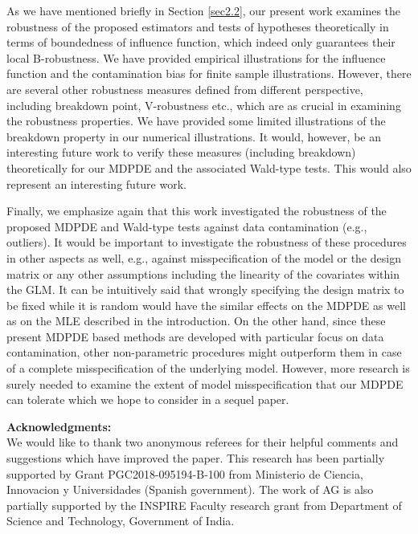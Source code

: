\documentclass[a4paper]{article}%
\begin{document}
As we have mentioned briefly in Section \ref{sec2.2}, 
our present work examines the robustness of the proposed estimators and tests of hypotheses theoretically 
in terms of boundedness of influence function, which indeed only guarantees their local B-robustness.
We have provided empirical illustrations for the influence function
and the contamination bias for finite sample illustrations. 
However, there are several other robustness measures defined from different perspective,
including breakdown point, V-robustness etc., which are as crucial in examining the robustness properties.
We have provided some limited illustrations of the breakdown property in our numerical illustrations. 
It would, however, be an interesting future work to verify these measures (including breakdown) theoretically for our MDPDE
and the associated Wald-type tests. 
This would also represent an interesting future work. 


Finally, we emphasize again that this work investigated the robustness of the proposed MDPDE and Wald-type tests
against data contamination (e.g., outliers). It would be important to investigate the robustness of these procedures
in other aspects as well, e.g., against misspecification of the model or the design matrix or 
any other assumptions including the linearity of the covariates within the GLM. 
It can be intuitively said that  wrongly specifying the design matrix to be fixed 
while it is random would have the similar effects on the MDPDE as well as on the MLE described in the introduction. 
On the other hand, since these present MDPDE based methods are developed with particular focus on data contamination, 
other non-parametric procedures might outperform them in case of a complete misspecification of the underlying model.
However, more research is surely needed to examine the extent of model misspecification that our MDPDE can tolerate
which we hope to consider in a sequel paper. 

\bigskip\bigskip
\noindent
\textbf{Acknowledgments:}\\
We would like to thank two anonymous referees for their helpful comments and suggestions which have improved the paper. 
This research has been partially supported by Grant PGC2018-095194-B-100 from Ministerio de Ciencia, Innovacion y Universidades (Spanish government).
The work of AG is also partially supported by the INSPIRE Faculty research grant from Department of Science and Technology, Government of India.
\end{document}
